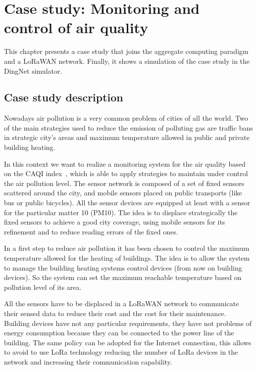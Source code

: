 \chapter{Case study: Monitoring and control of air quality}

\label{chap:case-staudyAC}
This chapter presents a case study that joins the aggregate computing paradigm and a LoRaWAN network. Finally, it shows a simulation of the case study in the DingNet simulator.

\section{Case study description}
Nowadays air pollution is a very common problem of cities of all the world.
Two of the main strategies used to reduce the emission of polluting gas are traffic bans in strategic city's areas and maximum temperature allowed in public and private building heating.

In this context we want to realize a monitoring system for the air quality based on the CAQI index~\cite{CAQI}, which is able to apply strategies to maintain under control the air pollution level.
The sensor network is composed of a set of fixed sensors scattered around the city, and mobile sensors placed on public transports (like bus or public bicycles).
All the sensor devices are equipped at least with a sensor for the particular matter 10 (PM10).
The idea is to displace strategically the fixed sensors to achieve a good city coverage, using mobile sensors for its refinement and to reduce reading errors of the fixed ones.

In a first step to reduce air pollution it has been chosen to control the maximum temperature allowed for the heating of buildings.
The idea is to allow the system to manage the building heating systems control devices (from now on building devices). So the system can set the maximum reachable temperature based on pollution level of its area.

All the sensors have to be displaced in a LoRaWAN network to communicate their sensed data to reduce their cost and the cost for their maintenance. 
Building devices have not any particular requirements, they have not problems of energy consumption because they can be connected to the power line of the building.
The same policy can be adopted for the Internet connection, this allows to avoid to use LoRa technology reducing the number of LoRa devices in the network and increasing their communication capability.

